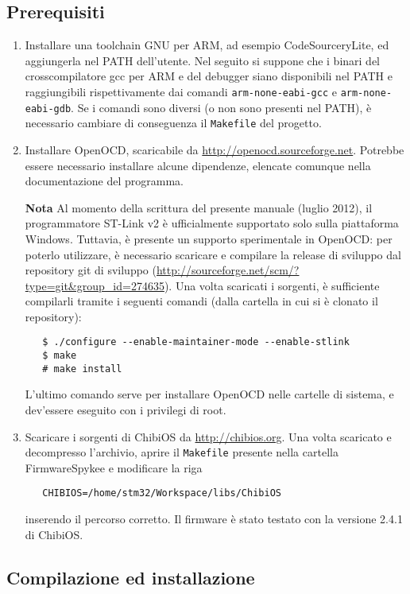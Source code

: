 \subsection*{Prerequisiti}
\begin{enumerate}
\item Installare una toolchain GNU per ARM, ad esempio CodeSourceryLite, ed aggiungerla nel PATH dell’utente. Nel seguito si suppone che i binari del crosscompilatore gcc per ARM e del debugger siano disponibili nel PATH e raggiungibili rispettivamente dai comandi \verb|arm-none-eabi-gcc| e \verb|arm-none-eabi-gdb|. Se i comandi sono diversi (o non sono presenti nel PATH), è necessario cambiare di conseguenza il \verb|Makefile| del progetto.

\item Installare OpenOCD, scaricabile da \url{http://openocd.sourceforge.net}. Potrebbe essere necessario installare alcune dipendenze, elencate comunque nella documentazione del programma.

\textbf{Nota } Al momento della scrittura del presente manuale (luglio 2012), il programmatore ST-Link v2 è ufficialmente supportato solo sulla piattaforma Windows. Tuttavia, è presente un supporto sperimentale in OpenOCD: per poterlo utilizzare, è necessario scaricare e compilare la release di sviluppo dal repository git di sviluppo (\url{http://sourceforge.net/scm/?type=git&group_id=274635}). Una volta scaricati i sorgenti, è sufficiente compilarli tramite i seguenti comandi  (dalla cartella in cui si è clonato il repository):
\begin{verbatim}
   $ ./configure --enable-maintainer-mode --enable-stlink
   $ make
   # make install
\end{verbatim}
L’ultimo comando serve per installare OpenOCD nelle cartelle di sistema, e dev'essere eseguito con i privilegi di root.

\item Scaricare i sorgenti di ChibiOS da \url{http://chibios.org}. Una volta scaricato e decompresso l'archivio, aprire il \verb|Makefile| presente nella cartella FirmwareSpykee e modificare la riga
\begin{verbatim}
   CHIBIOS=/home/stm32/Workspace/libs/ChibiOS
\end{verbatim}
inserendo il percorso corretto. Il firmware è stato testato con la versione 2.4.1 di ChibiOS.
\end{enumerate}

\subsection*{Compilazione ed installazione}

